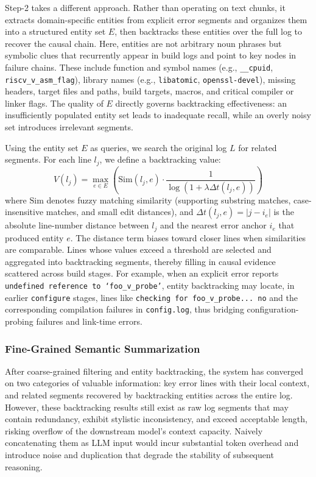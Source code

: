 \documentclass[sigconf,anonymous]{acmart}
\begin{document}
Step-2 takes a different approach. Rather than operating on text chunks, it extracts domain-specific entities from explicit error segments and organizes them into a structured entity set $E$, then backtracks these entities over the full log to recover the causal chain. Here, entities are not arbitrary noun phrases but symbolic clues that recurrently appear in build logs and point to key nodes in failure chains. These include function and symbol names (e.g., \texttt{\_\_cpuid}, \texttt{riscv\_v\_asm\_flag}), library names (e.g., \texttt{libatomic}, \texttt{openssl-devel}), missing headers, target files and paths, build targets, macros, and critical compiler or linker flags. The quality of $E$ directly governs backtracking effectiveness: an insufficiently populated entity set leads to inadequate recall, while an overly noisy set introduces irrelevant segments.

Using the entity set $E$ as queries, we search the original log $L$ for related segments. For each line $l_j$, we define a backtracking value:
\begin{equation}
V(l_j) = \max_{e \in E}\left(\mathrm{Sim}(l_j, e) \cdot \frac{1}{\log(1 + \lambda \Delta t(l_j, e))}\right)
\end{equation}
where $\mathrm{Sim}$ denotes fuzzy matching similarity (supporting substring matches, case-insensitive matches, and small edit distances), and $\Delta t(l_j, e) = |j - i_e|$ is the absolute line-number distance between $l_j$ and the nearest error anchor $i_e$ that produced entity $e$. The distance term biases toward closer lines when similarities are comparable. Lines whose values exceed a threshold are selected and aggregated into backtracking segments, thereby filling in causal evidence scattered across build stages. For example, when an explicit error reports \texttt{undefined reference to `foo\_v\_probe'}, entity backtracking may locate, in earlier \texttt{configure} stages, lines like \texttt{checking for foo\_v\_probe... no} and the corresponding compilation failures in \texttt{config.log}, thus bridging configuration-probing failures and link-time errors.

\subsubsection{Fine-Grained Semantic Summarization}

After coarse-grained filtering and entity backtracking, the system has converged on two categories of valuable information: key error lines with their local context, and related segments recovered by backtracking entities across the entire log. However, these backtracking results still exist as raw log segments that may contain redundancy, exhibit stylistic inconsistency, and exceed acceptable length, risking overflow of the downstream model's context capacity. Naively concatenating them as LLM input would incur substantial token overhead and introduce noise and duplication that degrade the stability of subsequent reasoning.
\end{document}
